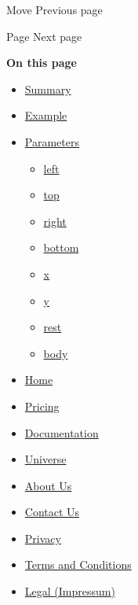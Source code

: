 { Move } { Previous page }

\href{/docs/reference/layout/page/}{\pandocbounded{}}

{ Page } { Next page }

\textbf{On this page}

\begin{itemize}
\tightlist
\item
  \hyperref[summary]{Summary}
\item
  \hyperref[example]{Example}
\item
  \hyperref[parameters]{Parameters}

  \begin{itemize}
  \tightlist
  \item
    \hyperref[parameters-left]{left}
  \item
    \hyperref[parameters-top]{top}
  \item
    \hyperref[parameters-right]{right}
  \item
    \hyperref[parameters-bottom]{bottom}
  \item
    \hyperref[parameters-x]{x}
  \item
    \hyperref[parameters-y]{y}
  \item
    \hyperref[parameters-rest]{rest}
  \item
    \hyperref[parameters-body]{body}
  \end{itemize}
\end{itemize}

\begin{itemize}
\tightlist
\item
  \href{/}{Home}
\item
  \href{/pricing/}{Pricing}
\item
  \href{/docs/}{Documentation}
\item
  \href{/universe/}{Universe}
\item
  \href{/about/}{About Us}
\item
  \href{/contact/}{Contact Us}
\item
  \href{/privacy/}{Privacy}
\item
  \href{https://typst.app/terms}{Terms and Conditions}
\item
  \href{/legal/}{Legal (Impressum)}
\end{itemize}

